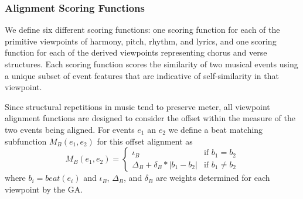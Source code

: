 \documentclass[phd,electronic,oneside,twosidetoc,letterpaper,chaptercenter,parttop,lof,lot]{byumsphd}
\begin{document}

\subsubsection{Alignment Scoring Functions}


We define six different scoring functions: one scoring function for each of the primitive viewpoints of harmony, pitch, rhythm, and lyrics, and one scoring function for each of the derived viewpoints representing chorus and verse structures. Each scoring function scores the similarity of two musical events using a unique subset of event features that are indicative of self-similarity in that viewpoint.

Since structural repetitions in music tend to preserve meter, all viewpoint alignment functions are designed to consider the offset within the measure of the two events being aligned. For events $e_1$ an $e_2$ we define a beat matching subfunction $M_B(e_1,e_2)$ for this offset alignment as
\[
  M_B(e_1,e_2) =
  \begin{cases}
	\iota_B & \text{if } b_1 = b_2 \\
	\Delta_B + \delta_B * |b_1 - b_2| & \text{if } b_1 \neq b_2 
  \end{cases}
\]
\noindent where $b_i=beat(e_i)$ and $\iota_B$, $\Delta_B$, and $\delta_B$ are weights determined for each viewpoint by the GA.
\end{document}
